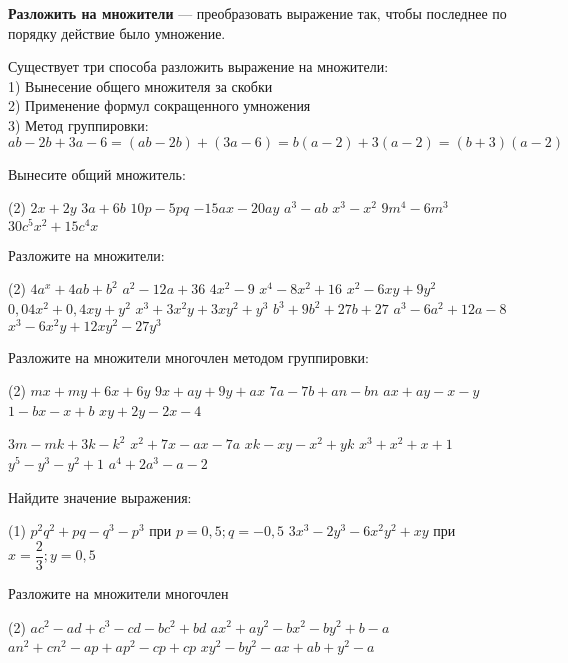 \begin{class}[number=3]
	\begin{definit}
		\textbf{Разложить на множители} --- преобразовать выражение так, чтобы последнее по порядку действие было умножение.
		
		Существует три способа разложить выражение на множители: \\
		1) Вынесение общего множителя за скобки \\
		2) Применение формул сокращенного умножения \\
		3) Метод группировки:\\ \( ab-2b+3a-6=(ab-2b)+(3a-6)=b(a-2)+3(a-2)=(b+3)(a-2) \)
	\end{definit}
	\begin{listofex}
		\item Вынесите общий множитель:
		\begin{tasks}(2)
			\task \( 2x+2y \)
			\task \( 3a+6b \)
			\task \( 10p-5pq \)
			\task \( -15ax-20ay \)
			\task \( a^3-ab \)
			\task \( x^3-x^2 \)
			\task \( 9m^4-6m^3 \)
			\task \( 30c^5x^2+15c^4x \)
		\end{tasks}
		\item Разложите на множители:
		\begin{tasks}(2)
			\task \( 4a^x+4ab+b^2 \)
			\task \( a^2-12a+36 \)
			\task \( 4x^2-9 \)
			\task \( x^4-8x^2+16 \)
			\task \( x^2-6xy+9y^2 \)
			\task \( 0,04x^2+0,4xy+y^2 \)
			\task \( x^3+3x^2y+3xy^2+y^3 \)
			\task \( b^3+9b^2+27b+27 \)
			\task \( a^3-6a^2+12a-8 \)
			\task \( x^3-6x^2y+12xy^2-27y^3 \)
		\end{tasks}
		\item Разложите на множители многочлен методом группировки:
		\begin{tasks}(2)
			\task \( mx+my+6x+6y \)
			\task \( 9x+ay+9y+ax \)
			\task \( 7a-7b+an-bn \)
			\task \( ax+ay-x-y \)
			\task \( 1-bx-x+b \)
			\task \( xy+2y-2x-4 \)
			
		
			\task \( 3m-mk+3k-k^2 \)
			\task \( x^2+7x-ax-7a \)
			\task \( xk-xy-x^2+yk \)
			\task \( x^3+x^2+x+1 \)
			\task \( y^5-y^3-y^2+1 \)
			\task \( a^4+2a^3-a-2 \)
			
		\end{tasks}
		\item Найдите значение выражения:
		\begin{tasks}(1)
			\task \( p^2q^2+pq-q^3-p^3 \) при \( p=0,5;q=-0,5 \)
			\task \( 3x^3-2y^3-6x^2y^2+xy \) при \( x=\dfrac{2}{3};y=0,5 \)
		\end{tasks}
		\item Разложите на множители многочлен %
		\begin{tasks}(2)
			\task \( ac^2-ad+c^3-cd-bc^2+bd \)
			\task \( ax^2+ay^2-bx^2-by^2+b-a \)
			\task \( an^2+cn^2-ap+ap^2-cp+cp \)
			\task \( xy^2-by^2-ax+ab+y^2-a \)
		\end{tasks}
	\end{listofex}
\end{class}

